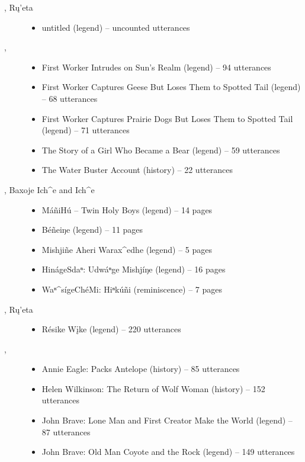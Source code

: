 \documentclass[output=paper]{LSP/langsci}
\begin{document}
\begin{description}
\item[\citet{Kennard1936}, Rų’eta]\hfill
\begin{itemize}
\item untitled (legend) -- uncounted utterances
\end{itemize}

\item[\citet{Lowie1939}, ]\hfill
\begin{itemize}
\item First Worker Intrudes on Sun’s Realm (legend) -- 94 utterances
\item First Worker Captures Geese But Loses Them to Spotted Tail (legend) -- 68 utterances
\item First Worker Captures Prairie Dogs But Loses Them to Spotted Tail (legend) -- 71 utterances
\item The Story of a Girl Who Became a Bear (legend) -- 59 utterances
\item The Water Buster Account (history) -- 22 utterances
\end{itemize}

\item[\citet{Marsh1936}, Baxoje Ich\^{}e and  Ich\^{}e]\hfill
\begin{itemize}
\item MáñiHú -- Twin Holy Boys (legend) -- 14 pages
\item Béñeiŋe (legend) -- 11 pages
\item Mishjiñe Aheri Warax\^{}edhe (legend) -- 5 pages
\item HinágeSdaⁿ: Udwáⁿge Mishjíŋe (legend) -- 16 pages
\item Waⁿ\^{}sígeChéMi: Hiⁿkúñi (reminiscence) -- 7 pages
\end{itemize}

\item[\citet{Mixco1997b}, Rų’eta]\hfill
\begin{itemize}
\item Résike Wįke (legend) -- 220 utterances
\end{itemize}

\item[\citet{ParksJonesHollow1978}, ]\hfill
\begin{itemize}
\item Annie Eagle: Packs Antelope (history) -- 85 utterances
\item Helen Wilkinson: The Return of Wolf Woman (history) -- 152 utterances
\item John Brave: Lone Man and First Creator Make the World (legend) -- 87 utterances
\item John Brave: Old Man Coyote and the Rock (legend) -- 149 utterances
\end{itemize}


\end{description}
\end{document}
